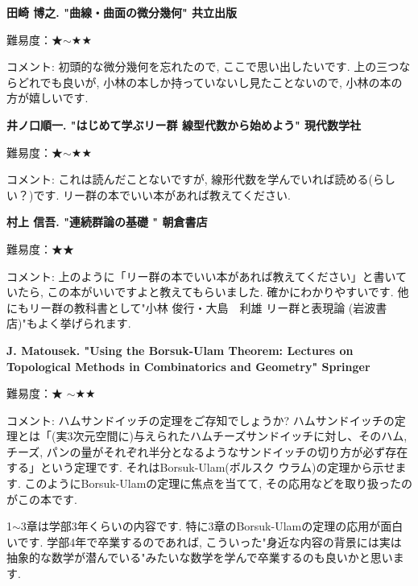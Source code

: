 \textbf{田崎 博之. "曲線・曲面の微分幾何" 共立出版}  　\vspace{-6pt} 

難易度：★$\sim$★★ 　\vspace{-6pt} 

コメント: 初頭的な微分幾何を忘れたので, ここで思い出したいです. 
上の三つならどれでも良いが, 小林の本しか持っていないし見たことないので, 小林の本の方が嬉しいです. 
\vspace{8pt}

\textbf{井ノ口順一. "はじめて学ぶリー群 線型代数から始めよう" 現代数学社}  　\vspace{-6pt} 

難易度：★$\sim$★★ 　\vspace{-6pt} 

コメント: これは読んだことないですが, 線形代数を学んでいれば読める(らしい？)です. リー群の本でいい本があれば教えてください. 
\vspace{8pt}

\textbf{村上 信吾. "連続群論の基礎 " 朝倉書店}  　\vspace{-6pt} 

難易度：★★ 　\vspace{-6pt} 

コメント: 上のように「リー群の本でいい本があれば教えてください」と書いていたら, この本がいいですよと教えてもらいました. 確かにわかりやすいです. 他にもリー群の教科書として"小林 俊行・大島　利雄 リー群と表現論 (岩波書店)"もよく挙げられます.
\vspace{8pt}

\textbf{J. Matousek. "Using the Borsuk-Ulam Theorem: Lectures on Topological Methods in Combinatorics and Geometry" Springer}  　\vspace{-6pt} 

難易度：★ $\sim$★★\vspace{-6pt} 

コメント: ハムサンドイッチの定理をご存知でしょうか? ハムサンドイッチの定理とは「(実3次元空間に)与えられたハムチーズサンドイッチに対し、そのハム, チーズ, パンの量がそれぞれ半分となるようなサンドイッチの切り方が必ず存在する」という定理です. それはBorsuk-Ulam(ボルスク ウラム)の定理から示せます. 
このようにBorsuk-Ulamの定理に焦点を当てて, その応用などを取り扱ったのがこの本です. 

1$\sim$3章は学部3年くらいの内容です. 特に3章のBorsuk-Ulamの定理の応用が面白いです. 学部4年で卒業するのであれば, こういった"身近な内容の背景には実は抽象的な数学が潜んでいる"みたいな数学を学んで卒業するのも良いかと思います. 
\vspace{8pt}

